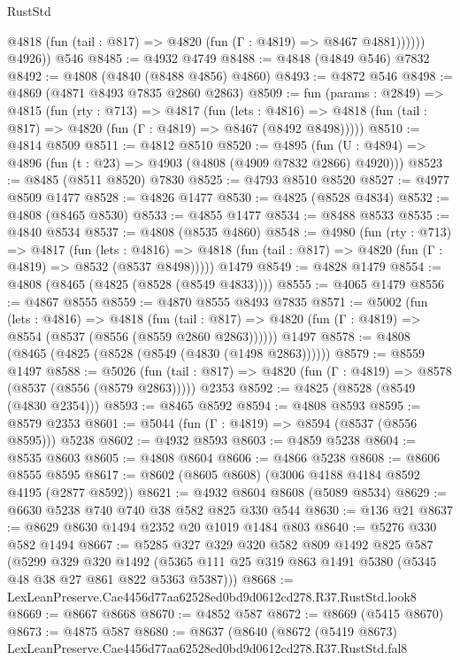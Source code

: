 \begin{lexlean}{RustStd}
\begin{coremodule}
              @4818 (fun (tail : @817) => @4820 (fun (Γ : @4819) => @8467 @4881))))))
        @4926))
    @546
@8485 := @4932 @4749
@8488 := @4848 (@4849 @546) @7832
@8492 := @4808 (@4840 (@8488 @4856) @4860)
@8493 := @4872 @546
@8498 := @4869 (@4871 @8493 @7835 @2860 @2863)
@8509 := fun (params : @2849) =>
  @4815
    (fun (rty : @713) =>
    @4817
      (fun (lets : @4816) =>
      @4818 (fun (tail : @817) => @4820 (fun (Γ : @4819) => @8467 (@8492 @8498)))))
@8510 := @4814 @8509
@8511 := @4812 @8510
@8520 := @4895 (fun (U : @4894) => @4896 (fun (t : @23) => @4903 (@4808 (@4909 @7832 @2866) @4920)))
@8523 := @8485 (@8511 @8520) @7830
@8525 := @4793 @8510 @8520
@8527 := @4977 @8509 @1477
@8528 := @4826 @1477
@8530 := @4825 (@8528 @4834)
@8532 := @4808 (@8465 @8530)
@8533 := @4855 @1477
@8534 := @8488 @8533
@8535 := @4840 @8534
@8537 := @4808 (@8535 @4860)
@8548 := @4980
    (fun (rty : @713) =>
    @4817
      (fun (lets : @4816) =>
      @4818 (fun (tail : @817) => @4820 (fun (Γ : @4819) => @8532 (@8537 @8498)))))
    @1479
@8549 := @4828 @1479
@8554 := @4808 (@8465 (@4825 (@8528 (@8549 @4833))))
@8555 := @4065 @1479
@8556 := @4867 @8555
@8559 := @4870 @8555 @8493 @7835
@8571 := @5002
    (fun (lets : @4816) =>
    @4818
      (fun (tail : @817) => @4820 (fun (Γ : @4819) => @8554 (@8537 (@8556 (@8559 @2860 @2863))))))
    @1497
@8578 := @4808 (@8465 (@4825 (@8528 (@8549 (@4830 (@1498 @2863))))))
@8579 := @8559 @1497
@8588 := @5026
    (fun (tail : @817) => @4820 (fun (Γ : @4819) => @8578 (@8537 (@8556 (@8579 @2863)))))
    @2353
@8592 := @4825 (@8528 (@8549 (@4830 @2354)))
@8593 := @8465 @8592
@8594 := @4808 @8593
@8595 := @8579 @2353
@8601 := @5044 (fun (Γ : @4819) => @8594 (@8537 (@8556 @8595))) @5238
@8602 := @4932 @8593
@8603 := @4859 @5238
@8604 := @8535 @8603
@8605 := @4808 @8604
@8606 := @4866 @5238
@8608 := @8606 @8555 @8595
@8617 := @8602 (@8605 @8608) (@3006 @4188 @4184 @8592 @4195 (@2877 @8592))
@8621 := @4932 @8604 @8608 (@5089 @8534)
@8629 := @6630 @5238 @740 @740 @38 @582 @825 @330 @544
@8630 := @136 @21
@8637 := @8629 @8630 @1494 @2352 @20 @1019 @1484 @803
@8640 := @5276 @330 @582 @1494
@8667 := @5285
    @327
    @329
    @320
    @582
    @809
    @1492
    @825
    @587
    (@5299
      @329
      @320
      @1492
      (@5365 @111 @25 @319 @863 @1491 @5380 (@5345 @48 @38 @27 @861 @822 @5363 @5387)))
@8668 := LexLeanPreserve.Cae4456d77aa62528ed0bd9d0612cd278.R37.RustStd.look8
@8669 := @8667 @8668
@8670 := @4852 @587
@8672 := @8669 (@5415 @8670)
@8673 := @4875 @587
@8680 := @8637
    (@8640
      (@8672
        (@5419 @8673)
        LexLeanPreserve.Cae4456d77aa62528ed0bd9d0612cd278.R37.RustStd.fal8

\end{coremodule}
\end{lexlean}
